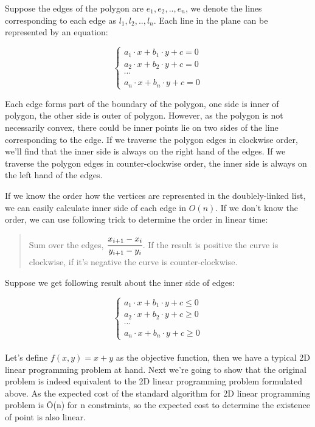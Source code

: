 
Suppose the edges of the polygon are $e_1, e_2, .., e_n$, we denote the lines corresponding to each edge as $l_1, l_2, .., l_n$. Each line in the plane can be represented by an equation:

\[
  \left\{
      \begin{array}{c}
          a_1 \cdot x + b_1 \cdot y + c = 0 \\
          a_2 \cdot x + b_2 \cdot y + c = 0 \\
          \cdots \\
          a_n \cdot x + b_n \cdot y + c = 0
      \end{array}
  \right.
\]

Each edge forms part of the boundary of the polygon, one side is inner of polygon, the other side is outer of polygon. However, as the polygon is not necessarily convex, there could be inner points lie on two sides of the line corresponding to the edge. If we traverse the polygon edges in clockwise order, we'll find that the inner side is always on the right hand of the edges. If we traverse the polygon edges in counter-clockwise order, the inner side is always on the left hand of the edges.

If we know the order how the vertices are represented in the doublely-linked list, we can easily calculate inner side of each edge in $O(n)$. If we don't know the order, we can use following trick to determine the order in linear time:

\begin{quote}
Sum over the edges, $\cfrac{x_{i+1}-x_i}{y_{i+1}-y_i}$. If the result is positive the curve is clockwise, if it's negative the curve is counter-clockwise.
\end{quote}

Suppose we get following result about the inner side of edges:

\[
  \left\{
      \begin{array}{c}
          a_1 \cdot x + b_1 \cdot y + c \leq 0 \\
          a_2 \cdot x + b_2 \cdot y + c \geq 0 \\
          \cdots \\
          a_n \cdot x + b_n \cdot y + c \geq 0
      \end{array}
  \right.
\]\\

Let's define $f(x, y) = x + y$ as the objective function, then we have a typical 2D linear programming problem at hand. Next we're going to show that the original problem is indeed equivalent to the 2D linear programming problem formulated above. As the expected cost of the standard algorithm for 2D linear programming problem is \~O(n) for n constraints, so the expected cost to determine the existence of point is also linear.\\

